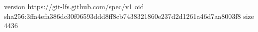 version https://git-lfs.github.com/spec/v1
oid sha256:3ffa4efa386dc30f06593ddd8ff8cb7438321860e237d2d1261a46d7aa8003f8
size 4436
